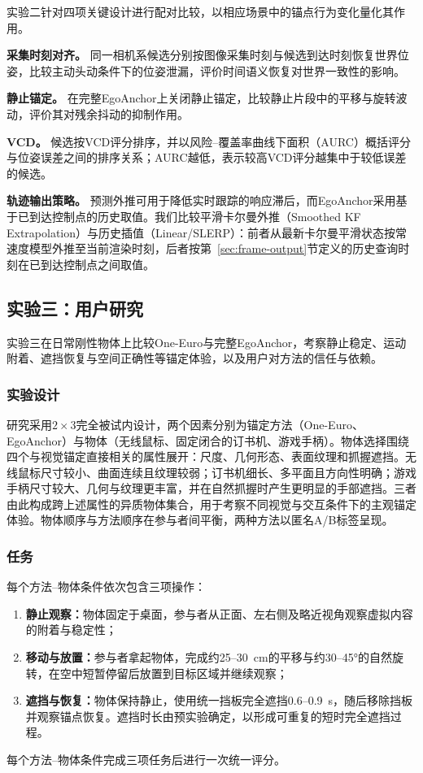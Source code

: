 \documentclass[review]{vgtc}
\begin{document}
实验二针对四项关键设计进行配对比较，以相应场景中的锚点行为变化量化其作用。

\textbf{采集时刻对齐。}
同一相机系候选分别按图像采集时刻与候选到达时刻恢复世界位姿，比较主动头动条件下的位姿泄漏，评价时间语义恢复对世界一致性的影响。

\textbf{静止锚定。}
在完整EgoAnchor上关闭静止锚定，比较静止片段中的平移与旋转波动，评价其对残余抖动的抑制作用。

\textbf{VCD。}
候选按VCD评分排序，并以风险--覆盖率曲线下面积（AURC）概括评分与位姿误差之间的排序关系；AURC越低，表示较高VCD评分越集中于较低误差的候选。

\textbf{轨迹输出策略。}
预测外推可用于降低实时跟踪的响应滞后，而EgoAnchor采用基于已到达控制点的历史取值。我们比较平滑卡尔曼外推（Smoothed KF Extrapolation）与历史插值（Linear/SLERP）：前者从最新卡尔曼平滑状态按常速度模型外推至当前渲染时刻，后者按第~\ref{sec:frame-output}节定义的历史查询时刻在已到达控制点之间取值。

\subsection{实验三：用户研究}\label{sec:exp3-design}

实验三在日常刚性物体上比较One-Euro与完整EgoAnchor，考察静止稳定、运动附着、遮挡恢复与空间正确性等锚定体验，以及用户对方法的信任与依赖。

\subsubsection{实验设计}

研究采用$2 \times 3$完全被试内设计，两个因素分别为锚定方法（One-Euro、EgoAnchor）与物体（无线鼠标、固定闭合的订书机、游戏手柄）。物体选择围绕四个与视觉锚定直接相关的属性展开：尺度、几何形态、表面纹理和抓握遮挡。无线鼠标尺寸较小、曲面连续且纹理较弱；订书机细长、多平面且方向性明确；游戏手柄尺寸较大、几何与纹理更丰富，并在自然抓握时产生更明显的手部遮挡。三者由此构成跨上述属性的异质物体集合，用于考察不同视觉与交互条件下的主观锚定体验。物体顺序与方法顺序在参与者间平衡，两种方法以匿名A/B标签呈现。

\subsubsection{任务}

每个方法--物体条件依次包含三项操作：
\begin{enumerate}[leftmargin=1.8em,label=(\arabic*),itemsep=1pt,topsep=2pt]
  \item \textbf{静止观察：}物体固定于桌面，参与者从正面、左右侧及略近视角观察虚拟内容的附着与稳定性；
  \item \textbf{移动与放置：}参与者拿起物体，完成约25--30~cm的平移与约30--45°的自然旋转，在空中短暂停留后放置到目标区域并继续观察；
  \item \textbf{遮挡与恢复：}物体保持静止，使用统一挡板完全遮挡0.6--0.9~s，随后移除挡板并观察锚点恢复。遮挡时长由预实验确定，以形成可重复的短时完全遮挡过程。
\end{enumerate}
每个方法--物体条件完成三项任务后进行一次统一评分。
\end{document}
